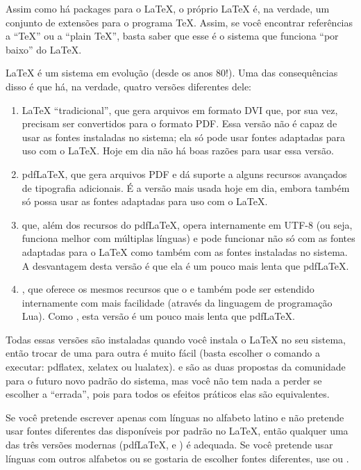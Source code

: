 Assim como há packages para o \LaTeX{}, o próprio \LaTeX{} é, na verdade, um
conjunto de extensões para o programa \TeX{}. Assim, se você encontrar
referências a ``\TeX{}'' ou a ``plain \TeX{}'', basta saber que esse é o
sistema que funciona ``por baixo'' do \LaTeX{}.

\LaTeX{} é um sistema em evolução (desde os anos 80!). Uma das consequências
disso é que há, na verdade, quatro versões diferentes dele:

\begin{enumerate}
\item \LaTeX{} ``tradicional'', que gera arquivos em formato DVI que, por
sua vez, precisam ser convertidos para o formato PDF. Essa versão não é
capaz de usar as fontes instaladas no sistema; ela só pode usar fontes
adaptadas para uso com o \LaTeX{}. Hoje em dia não há boas razões para
usar essa versão.

\item pdf\LaTeX{}, que gera arquivos PDF e dá suporte a alguns recursos
avançados de tipografia adicionais. É a versão mais usada hoje em dia,
embora também só possa usar as fontes adaptadas para uso com o \LaTeX{}.

\item \XeLaTeX{} que, além dos recursos do pdf\LaTeX{}, opera internamente
em UTF-8 (ou seja, funciona melhor com múltiplas línguas) e pode funcionar
não só com as fontes adaptadas para o \LaTeX{} como também com as fontes
instaladas no sistema. A desvantagem desta versão é que ela é um pouco
mais lenta que pdf\LaTeX{}.

\item \LuaLaTeX{}, que oferece os mesmos recursos que o \XeLaTeX{} e
também pode ser estendido internamente com mais facilidade (através da
linguagem de programação Lua). Como \XeLaTeX{}, esta versão é um pouco
mais lenta que pdf\LaTeX{}.
\end{enumerate}

Todas essas versões são instaladas quando você instala o \LaTeX{} no seu
sistema, então trocar de uma para outra é muito fácil (basta escolher o
comando a executar: pdflatex, xelatex ou lualatex). \XeLaTeX{} e
\LuaLaTeX{} são as duas propostas da comunidade para o futuro novo padrão
do sistema, mas você não tem nada a perder se escolher a ``errada'', pois
para todos os efeitos práticos elas são equivalentes.

Se você pretende escrever apenas com línguas no alfabeto latino e não
pretende usar fontes diferentes das disponíveis por padrão no \LaTeX{},
então qualquer uma das três versões modernas (pdf\LaTeX{}, \XeLaTeX{}
e \LuaLaTeX{}) é adequada. Se você pretende usar línguas com outros
alfabetos ou se gostaria de escolher fontes diferentes, use \XeLaTeX{}
ou \LuaLaTeX{}.

